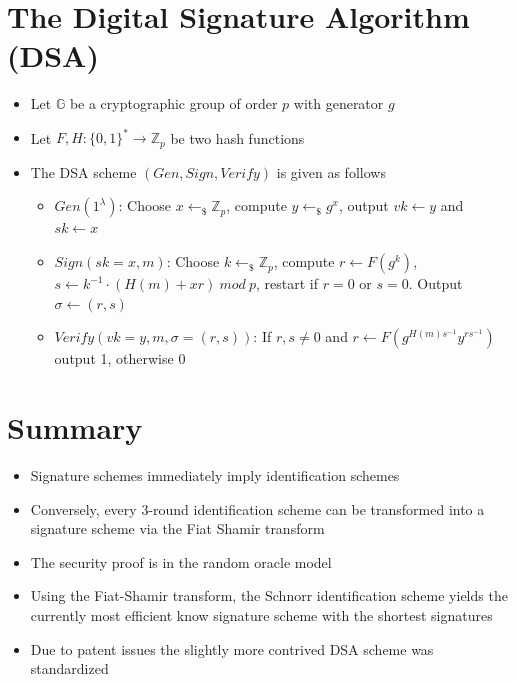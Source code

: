 \section{The Digital Signature Algorithm (DSA)}
    \begin{itemize}
        \item Let $\mathbb{G}$ be a cryptographic group of order $p$ with generator $g$
        \item Let $F,H: \{0,1\}^* \rightarrow \mathbb{Z}_p$ be two hash functions
        \item The DSA scheme $(Gen,Sign,Verify)$ is given as follows
        \begin{itemize}
            \item $Gen(1^{\lambda})$: Choose $x \leftarrow_{\$} \mathbb{Z}_p$, compute $y \leftarrow_{\$} g^x$, output $vk \leftarrow y$ and $sk \leftarrow x$
            \item $Sign(sk=x,m)$: Choose $k \leftarrow_{\$} \mathbb{Z}_p$, compute $r \leftarrow F(g^k)$, $s \leftarrow k^{-1} \cdot (H(m)+xr)\ mod\ p$, restart if $r=0$ or $s=0$.
            Output $\sigma \leftarrow (r,s)$
            \item $Verify(vk=y,m,\sigma = (r,s))$: If $r,s \neq 0$ and $r \leftarrow F(g^{H(m)s^{-1}}y^{rs^{-1}})$ output 1, otherwise 0
        \end{itemize}
    \end{itemize}

\section{Summary}
    \begin{itemize}
        \item Signature schemes immediately imply identification schemes
        \item Conversely, every 3-round identification scheme can be transformed into a signature scheme via the Fiat Shamir transform
        \item The security proof is in the random oracle model
        \item Using the Fiat-Shamir transform, the Schnorr identification scheme yields the currently most efficient know signature scheme with the shortest signatures
        \item Due to patent issues the slightly more contrived DSA scheme was standardized
    \end{itemize}
        

